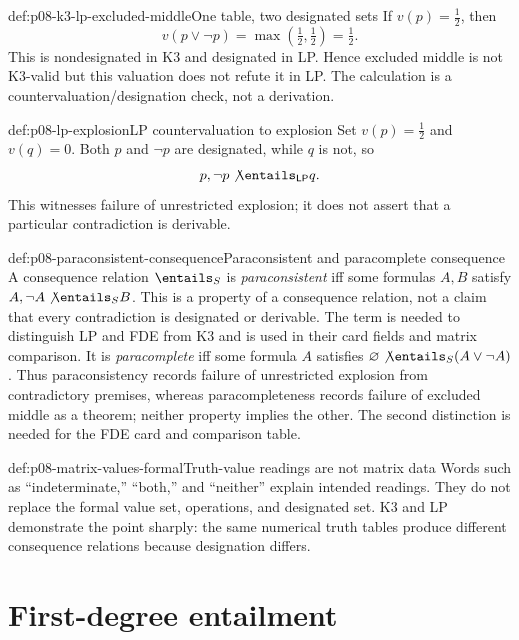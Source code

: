 \begin{hbexample}{def:p08-k3-lp-excluded-middle}{One table, two designated sets}
If \(v(p)=\tfrac12\), then
\[
  v(p\lor\neg p)=\max(\tfrac12,\tfrac12)=\tfrac12.
\]
This is nondesignated in K3 and designated in LP.  Hence excluded middle is
not K3-valid but this valuation does not refute it in LP.  The calculation is a
countervaluation/designation check, not a derivation.
\end{hbexample}

\begin{hbexample}{def:p08-lp-explosion}{LP countervaluation to explosion}
Set \(v(p)=\tfrac12\) and \(v(q)=0\).  Both \(p\) and \(\neg p\) are
designated, while \(q\) is not, so
\[
  p,\neg p\not\entails_{\mathsf{LP}}q.
\]
This witnesses failure of unrestricted explosion; it does not assert that a
particular contradiction is derivable.
\end{hbexample}

\begin{hbdefinition}{def:p08-paraconsistent-consequence}{Paraconsistent and paracomplete consequence}
A consequence relation \(\entails_{S}\) is \emph{paraconsistent} iff some
formulas \(A,B\) satisfy
\(A,\neg A\not\entails_{S}B\).  This is a property of a consequence relation,
not a claim that every contradiction is designated or derivable.  The term is
needed to distinguish LP and FDE from K3 and is used in their card fields and
matrix comparison.  It is \emph{paracomplete} iff some formula \(A\) satisfies
\(\varnothing\not\entails_{S}(A\lor\neg A)\).  Thus paraconsistency records failure of
unrestricted explosion from contradictory premises, whereas paracompleteness
records failure of excluded middle as a theorem; neither property implies the
other.  The second distinction is needed for the FDE card and comparison table.
\end{hbdefinition}

\begin{hbwarning}{def:p08-matrix-values-formal}{Truth-value readings are not matrix data}
Words such as ``indeterminate,'' ``both,'' and ``neither'' explain intended
readings.  They do not replace the formal value set, operations, and designated
set.  K3 and LP demonstrate the point sharply: the same numerical truth tables
produce different consequence relations because designation differs.
\end{hbwarning}

\section{First-degree entailment}

